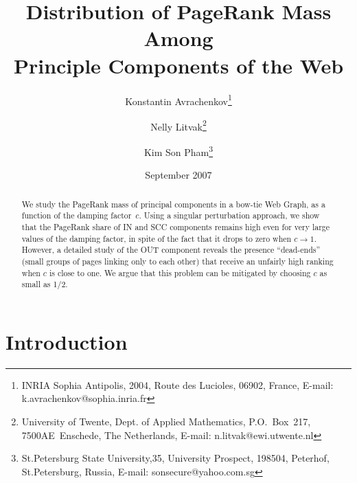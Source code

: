 \documentclass{article}
\begin{document}
\title{Distribution of PageRank Mass Among\\ Principle Components of the Web}

\author{Konstantin Avrachenkov\thanks{ 
INRIA Sophia Antipolis, 2004, Route des Lucioles,
06902, France, E-mail: k.avrachenkov@sophia.inria.fr}
\and Nelly Litvak\thanks{ 
University of Twente, Dept. of Applied Mathematics, P.O.~Box~217,
7500AE~Enschede, The Netherlands,
E-mail: n.litvak@ewi.utwente.nl}
\and Kim Son Pham\thanks{
St.Petersburg State
University,35, University Prospect, 198504, Peterhof, St.Petersburg, Russia,
E-mail: sonsecure@yahoo.com.sg }}

\date{September 2007}

\maketitle

\begin{abstract}
We study the PageRank mass of principal components in a bow-tie Web
Graph, as a function of the damping factor~$c$. Using a singular
perturbation approach, we show that the PageRank share of IN and SCC
components remains high even for very large values of the damping
factor, in spite of the fact that it drops to zero when $c\to 1$.
However, a detailed study of the OUT component reveals the presence
``dead-ends'' (small groups of pages linking only to each other)
that receive an unfairly high ranking when $c$ is close to one. We
argue that this problem can be mitigated by choosing $c$ as small as
1/2.
\end{abstract}



\section{Introduction}
\end{document}
